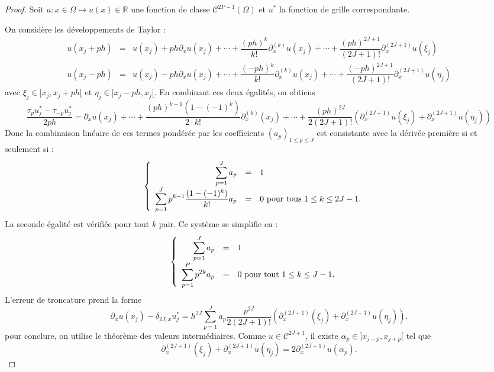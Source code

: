 \begin{proof}
Soit $u : x \in \Omega \mapsto u(x) \in \mathbb{R}$ une fonction de classe $\mathcal{C}^{2P+1}( \Omega)$ et $u^*$ la fonction de grille correspondante.

On considère les développements de Taylor :
\begin{equation}
\begin{array}{rcl}
u(x_j + ph) & = & u(x_j) + p h \partial_x u(x_j) + \cdots + \dfrac{(ph)^k}{k!}\partial_x^{(k)}u(x_j) + \cdots +\dfrac{(ph)^{2J+1}}{(2J+1)!} \partial_x^{(2J+1)}u (\xi_j)\\
u(x_j - ph) & = & u(x_j) - p h \partial_x u(x_j) + \cdots + \dfrac{(-ph)^k}{k!}\partial_x^{(k)}u(x_j) + \cdots +\dfrac{(-ph)^{2J+1}}{(2J+1)!} \partial_x^{(2J+1)}u(\eta_j)
\end{array}
\end{equation}
avec $\xi_j \in ]x_j, x_j+ph[$ et $\eta_j \in ]x_j-ph, x_j[$. En combinant ces deux égalités, on obtiens
\begin{equation}
\dfrac{\tau_p u^*_j - \tau_{-p} u^*_j}{2ph} = \partial_x u(x_j) + \cdots + \dfrac{(ph)^{k-1}(1 - (-1)^k)}{2 \cdot k!} \partial_x^{(k)}(x_j) + \cdots +\dfrac{(ph)^{2J}}{2(2J+1)!} \left( \partial^{(2J+1)}_x u(\xi_j) + \partial_x^{(2J+1)}u(\eta_j) \right)
\end{equation}
Donc la combinaison linéaire de ces termes pondérée par les coefficients $(a_p)_{1 \leq p \leq J}$ est consistante avec la dérivée première si et seulement si :
\begin{equation}
\left\lbrace
\begin{array}{rcll}
\displaystyle\sum\limits_{p=1}^J a_p & = & 1 & \\
\displaystyle\sum\limits_{p=1}^J p^{k-1} \dfrac{(1 - (-1)^k)}{k!} a_p & = & 0 \text{ pour tous } 1 \leq k \leq 2J-1.
\end{array}
\right.
\end{equation}
La seconde égalité est vérifiée pour tout $k$ pair. Ce système se simplifie en :
\begin{equation}
\left\lbrace
\begin{array}{rcll}
\displaystyle\sum\limits_{p=1}^J a_p & = & 1 & \\
\displaystyle\sum\limits_{p=1}^P p^{2k} a_p & = & 0 \text{ pour tout } 1 \leq k \leq J-1.
\end{array}
\right.
\end{equation}
L'erreur de troncature prend la forme
\begin{equation}
\partial_x u(x_j) - \delta_{2J,x} u^*_j = h^{2J} \sum_{p=1}^J a_p \dfrac{p^{2J}}{2(2J+1)!} \left( \partial_x^{(2J+1)}(\xi_j) + \partial_x^{(2J+1)}u(\eta_j) \right).
\end{equation}
pour conclure, on utilise le théorème des valeurs intermédiaires. Comme $u \in \mathcal{C}^{2J+1}$, il existe $\alpha_p \in ]x_{j-p}, x_{j+p}[$ tel que
\begin{equation}
\partial_x^{(2J+1)}(\xi_j) + \partial_x^{(2J+1)}u(\eta_j) = 2 \partial_x^{(2J+1)}u(\alpha_p).
\end{equation}
\end{proof}

